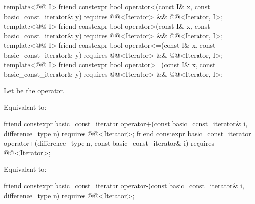 %
%
%
%
\begin{itemdecl}
template<@@ I>
  friend constexpr bool operator<(const I& x, const basic_const_iterator& y)
    requires @@<Iterator> && @@<Iterator, I>;
template<@@ I>
  friend constexpr bool operator>(const I& x, const basic_const_iterator& y)
    requires @@<Iterator> && @@<Iterator, I>;
template<@@ I>
  friend constexpr bool operator<=(const I& x, const basic_const_iterator& y)
    requires @@<Iterator> && @@<Iterator, I>;
template<@@ I>
  friend constexpr bool operator>=(const I& x, const basic_const_iterator& y)
    requires @@<Iterator> && @@<Iterator, I>;
\end{itemdecl}

\begin{itemdescr}
\pnum
Let  be the operator.

\pnum
\effects
Equivalent to: 
\end{itemdescr}

%
\begin{itemdecl}
friend constexpr basic_const_iterator operator+(const basic_const_iterator& i, difference_type n)
  requires @@<Iterator>;
friend constexpr basic_const_iterator operator+(difference_type n, const basic_const_iterator& i)
  requires @@<Iterator>;
\end{itemdecl}

\begin{itemdescr}
\pnum
\effects
Equivalent to: 
\end{itemdescr}

%
\begin{itemdecl}
friend constexpr basic_const_iterator operator-(const basic_const_iterator& i, difference_type n)
  requires @@<Iterator>;
\end{itemdecl}

